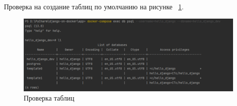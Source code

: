 	Проверка на создание таблиц по умолчанию на рисунке ~\ref{picture5}.
\begin{figure}[!ht]
  \centering
  \includegraphics[scale=0.35]{ResearchNotes/rndhpc_not_gui_2022_10_29/picture5.png}
  \caption{Проверка таблиц}
  \label{picture5}
\end{figure}
\noteattributes{}

